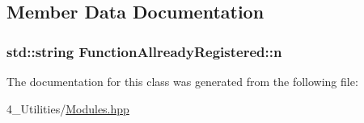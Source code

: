 \subsection{Member Data Documentation}
\subsubsection[{\texorpdfstring{n}{n}}]{\setlength{\rightskip}{0pt plus 5cm}std\+::string Function\+Allready\+Registered\+::n\hspace{0.3cm}{\ttfamily [protected]}}\hypertarget{class_function_allready_registered_aa76fa85233839b55de8ce0d1f0201933}{}\label{class_function_allready_registered_aa76fa85233839b55de8ce0d1f0201933}


The documentation for this class was generated from the following file\+:\begin{DoxyCompactItemize}
\item 
4\+\_\+\+Utilities/\hyperlink{_modules_8hpp}{Modules.\+hpp}\end{DoxyCompactItemize}
